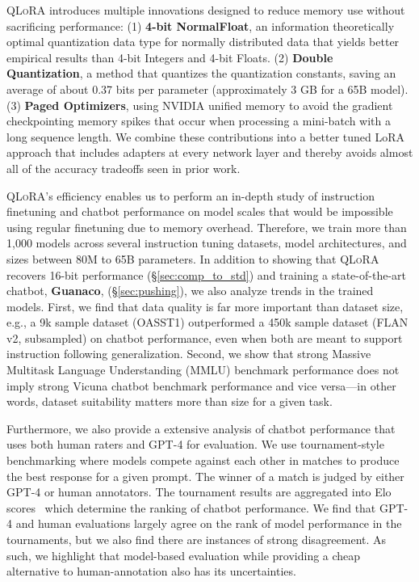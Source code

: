 \documentclass{article}
\newcommand{\method}{\textsc{QLoRA}\xspace}
\newcommand{\bfmodel}{\textbf{Guanaco}\xspace}
\newcommand{\Doublequant}{Double Quantization\xspace}
\newcommand{\Pagedoptim}{Paged Optimizers\xspace}
\begin{document}
\method introduces multiple innovations designed to reduce memory use without sacrificing performance: (1) \textbf{4-bit NormalFloat}, an information theoretically optimal quantization data type for normally distributed data that yields better empirical results than 4-bit Integers and 4-bit Floats. (2) \textbf{\Doublequant}, a method that quantizes the quantization constants, saving an average of about 0.37 bits per parameter (approximately 3 GB for a 65B model). (3) \textbf{\Pagedoptim}, using NVIDIA unified memory to avoid the gradient checkpointing memory spikes that occur when processing a mini-batch with a long sequence length. We combine these contributions into a better tuned LoRA approach that includes adapters at every network layer and thereby avoids almost all of the accuracy tradeoffs seen in prior work.

\method's efficiency enables us to perform an in-depth study of instruction finetuning and chatbot performance on model scales that would be impossible using regular finetuning due to memory overhead. Therefore, we train more than 1,000 models across several instruction tuning datasets, model architectures, and sizes between 80M to 65B parameters. In addition to showing that \method recovers 16-bit performance (\S\ref{sec:comp_to_std}) and training a state-of-the-art chatbot, \bfmodel, (\S\ref{sec:pushing}), we also analyze trends in the trained models. First, we find that data quality is far more important than dataset size, e.g., a 9k sample dataset (OASST1) outperformed a 450k sample dataset (FLAN v2, subsampled) on chatbot performance, even when both are meant to support instruction following generalization. Second, we show that strong Massive Multitask Language Understanding (MMLU) benchmark performance does not imply strong Vicuna chatbot benchmark performance and vice versa—in other words, dataset suitability matters more than size for a given task. 

Furthermore, we also provide a extensive analysis of chatbot performance that uses both human raters and GPT-4 for evaluation. We use tournament-style benchmarking where models compete against each other in matches to produce the best response for a given prompt. The winner of a match is judged by either GPT-4 or human annotators. The tournament results are aggregated into Elo scores~\citep{elo1967proposed, elo1978rating} which determine the ranking of chatbot performance. We find that GPT-4 and human evaluations largely agree on the rank of model performance in the tournaments, but we also find there are instances of strong disagreement. As such, we highlight that model-based evaluation while providing a cheap alternative to human-annotation also has its uncertainties. 
\end{document}
